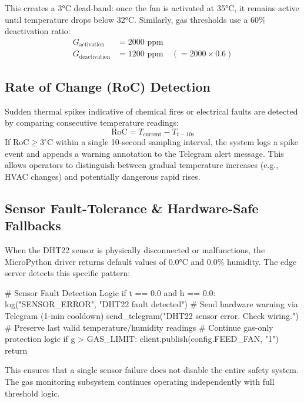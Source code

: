 \documentclass[12pt,a4paper]{report}
\begin{document}
This creates a 3°C dead-band: once the fan is activated at 35°C, it remains active until temperature drops below 32°C. Similarly, gas thresholds use a 60\% deactivation ratio:
\begin{align}
    G_{\text{activation}} &= 2000 \text{ ppm} \\
    G_{\text{deactivation}} &= 1200 \text{ ppm} \quad (= 2000 \times 0.6)
\end{align}

\subsection{Rate of Change (RoC) Detection}
Sudden thermal spikes indicative of chemical fires or electrical faults are detected by comparing consecutive temperature readings:
\begin{equation}
    \text{RoC} = T_{\text{current}} - T_{t-10\text{s}}
\end{equation}
If $\text{RoC} \ge 3^{\circ}$C within a single 10-second sampling interval, the system logs a spike event and appends a warning annotation to the Telegram alert message. This allows operators to distinguish between gradual temperature increases (e.g., HVAC changes) and potentially dangerous rapid rises.

\subsection{Sensor Fault-Tolerance \& Hardware-Safe Fallbacks}
When the DHT22 sensor is physically disconnected or malfunctions, the MicroPython driver returns default values of 0.0°C and 0.0\% humidity. The edge server detects this specific pattern:

\begin{codebox}[Python]
# Sensor Fault Detection Logic
if t == 0.0 and h == 0.0:
    log("SENSOR_ERROR", "DHT22 fault detected")
    # Send hardware warning via Telegram (1-min cooldown)
    send_telegram("DHT22 sensor error. Check wiring.")
    # Preserve last valid temperature/humidity readings
    # Continue gas-only protection logic
    if g > GAS_LIMIT:
        client.publish(config.FEED_FAN, "1")
    return
\end{codebox}

This ensures that a single sensor failure does not disable the entire safety system. The gas monitoring subsystem continues operating independently with full threshold logic.
\end{document}
